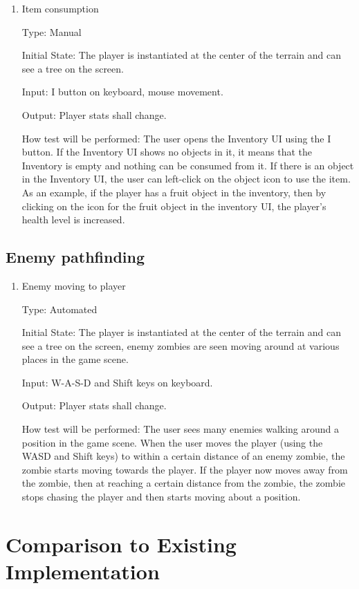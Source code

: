 \documentclass[12pt, titlepage]{article}
\begin{document}
\begin{enumerate}
\item{Item consumption\\}

Type: Manual

Initial State: The player is instantiated at the center of the terrain and can see a tree on the screen.

Input: I button on keyboard, mouse movement.

Output: Player stats shall change.

How test will be performed:
The user opens the Inventory UI using the I button. If the Inventory UI shows no objects in it, it means that the Inventory is empty and nothing can be consumed from it. If there is an object in the Inventory UI, the user can left-click on the object icon to use the item. As an example, if the player has a fruit object in the inventory, then by clicking on the icon for the fruit object in the inventory UI, the player's health level is increased. 

\end{enumerate}

\subsection{Enemy pathfinding}

\begin{enumerate}
	\item {Enemy moving to player\\}

	Type: Automated
	
	Initial State: The player is instantiated at the center of the terrain and can see a tree on the screen, enemy zombies are seen moving around at various places in the game scene.
	
	Input: W-A-S-D and Shift keys on keyboard.
	
	Output: Player stats shall change.
	
	How test will be performed:
	The user sees many enemies walking around a position in the game scene. When the user moves the player (using the WASD and Shift keys) to within a certain distance of an enemy zombie, the zombie starts moving towards the player. If the player now moves away from the zombie, then at reaching a certain distance from the zombie, the zombie stops chasing the player and then starts moving about a position.
	
\end{enumerate}
	
\section{Comparison to Existing Implementation}	
\end{document}
